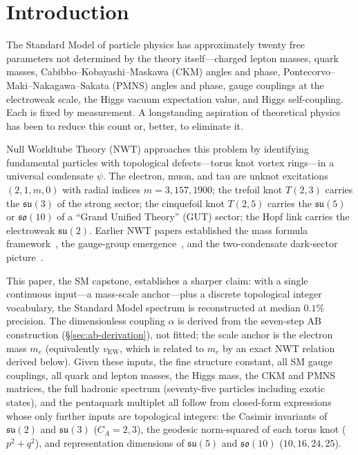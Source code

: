 \documentclass[11pt]{article}
\newcommand{\su}{\mathfrak{su}}
\newcommand{\so}{\mathfrak{so}}
\newcommand{\CA}{C_A}
\begin{document}
\tableofcontents

\section{Introduction}
\label{sec:intro}

The Standard Model of particle physics has approximately twenty
free parameters not determined by the theory itself---charged
lepton masses, quark masses, Cabibbo--Kobayashi--Maskawa (CKM)
angles and phase, Pontecorvo--Maki--Nakagawa--Sakata (PMNS) angles
and phase, gauge couplings at the electroweak scale, the Higgs
vacuum expectation value, and Higgs self-coupling.  Each is fixed
by measurement.  A longstanding aspiration of theoretical physics
has been to reduce this count or, better, to eliminate it.

Null Worldtube Theory (NWT) approaches this problem by
identifying fundamental particles with topological defects---torus
knot vortex rings---in a universal condensate $\psi$.  The
electron, muon, and tau are unknot excitations $(2,1,m,0)$ with
radial indices $m = 3, 157, 1900$; the trefoil knot $T(2,3)$
carries the $\su(3)$ of the strong sector; the cinquefoil knot
$T(2,5)$ carries the $\su(5)$ or $\so(10)$ of a ``Grand Unified
Theory'' (GUT) sector; the Hopf link carries the electroweak
$\su(2)$.  Earlier NWT papers established the mass formula
framework~\cite{NWT6}, the gauge-group emergence~\cite{NWT8},
and the two-condensate dark-sector picture~\cite{NWT10}.

This paper, the SM capstone, establishes a sharper claim: with
a single continuous input---a mass-scale anchor---plus a
discrete topological integer vocabulary, the Standard Model
spectrum is reconstructed at median $0.1\%$ precision.  The
dimensionless coupling $\alpha$ is derived from the seven-step
AB construction (\S\ref{sec:ab-derivation}), not fitted; the
scale anchor is the electron mass $m_e$ (equivalently
$v_\text{EW}$, which is related to $m_e$ by an exact NWT
relation derived below).  Given these inputs, the fine
structure constant, all SM gauge
couplings, all quark and lepton masses, the Higgs mass, the CKM
and PMNS matrices, the full hadronic spectrum (seventy-five
particles including exotic states), and the pentaquark multiplet
all follow from closed-form expressions whose only further inputs
are topological integers: the Casimir invariants of $\su(2)$ and
$\su(3)$ ($\CA = 2, 3$), the geodesic norm-squared of each torus
knot ($p^2+q^2$), and representation dimensions of $\su(5)$ and
$\so(10)$ ($10, 16, 24, 25$).
\end{document}
